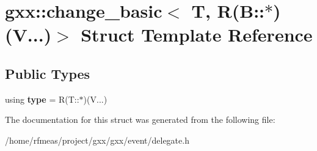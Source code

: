 \hypertarget{structgxx_1_1change__basic_3_01T_00_01R_07B_1_1_5_08_07V_8_8_8_08_4}{}\section{gxx\+:\+:change\+\_\+basic$<$ T, R(B\+:\+:$\ast$)(V...)$>$ Struct Template Reference}
\label{structgxx_1_1change__basic_3_01T_00_01R_07B_1_1_5_08_07V_8_8_8_08_4}
\subsection*{Public Types}
\begin{DoxyCompactItemize}
\item 
using {\bfseries type} = R(T\+::$\ast$)(V...)\hypertarget{structgxx_1_1change__basic_3_01T_00_01R_07B_1_1_5_08_07V_8_8_8_08_4_a04925e59d8f5baca4577299a5f9e81d0}{}\label{structgxx_1_1change__basic_3_01T_00_01R_07B_1_1_5_08_07V_8_8_8_08_4_a04925e59d8f5baca4577299a5f9e81d0}

\end{DoxyCompactItemize}


The documentation for this struct was generated from the following file\+:\begin{DoxyCompactItemize}
\item 
/home/rfmeas/project/gxx/gxx/event/delegate.\+h\end{DoxyCompactItemize}
